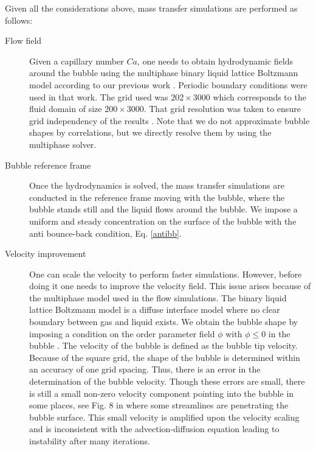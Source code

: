 \documentclass[preprint,12pt]{elsarticle}
\begin{document}
Given all the considerations above, mass transfer simulations are performed as follows:
\begin{description}
 \item[Flow field] Given a capillary number $Ca$, one needs to obtain hydrodynamic fields around
the bubble using the multiphase binary liquid lattice Boltzmann model according to our previous work
\cite{kuzmin-binary2d}. Periodic boundary conditions were used in that work. The grid used  was
$202\times 3000$ which corresponds to the fluid domain  of size $200\times3000$. That grid resolution was
taken to ensure grid
independency of the results \cite{kuzmin-binary2d}. Note that we do not approximate bubble shapes by correlations, but we directly resolve them by using the multiphase solver. 
 \item[Bubble reference frame] Once the hydrodynamics is solved, the mass transfer simulations
are conducted in the reference frame moving with the bubble, where the bubble stands still and the liquid
flows around the
bubble. We impose a uniform and steady concentration on the surface
of the bubble with the anti bounce-back condition, Eq. \ref{antibb}.
 \item[Velocity improvement] One can scale the velocity to
perform faster simulations. However, before doing it one needs to improve the velocity field.
This issue arises because of the
multiphase model used in the flow simulations. The binary liquid lattice Boltzmann model is a diffuse
interface model where no clear boundary between gas and liquid exists.
We obtain the bubble shape by imposing a condition on the order parameter field $\phi$ with $\phi\leq0$ in the bubble \cite{kuzmin-binary2d}. The velocity of the
bubble is defined as the bubble tip velocity. Because of the square grid, the shape of the bubble is determined within an accuracy of one grid spacing. Thus,
there is an error in the determination of the bubble velocity. Though these errors are small,
there is still a small non-zero velocity component pointing into the bubble in some places, see Fig. 8 in
\cite{kuzmin-binary2d} where some streamlines are penetrating the bubble surface.
This small velocity is amplified upon the velocity scaling and is inconsistent with the
advection-diffusion equation leading to instability after many iterations.


\end{description}
\end{document}
